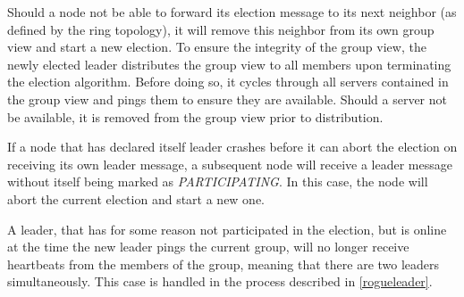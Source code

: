 \documentclass[runningheads]{llncs}
\begin{document}
Should a node not be able to forward its election message to its next neighbor (as defined by the ring topology), it will remove this neighbor from its own group view and start a new election. To ensure the integrity of the group view, the newly elected leader distributes the group view to all members upon terminating the election algorithm. Before doing so, it cycles through all servers contained in the group view and pings them to ensure they are available. Should a server not be available, it is removed from the group view prior to distribution.

If a node that has declared itself leader crashes before it can abort the election on receiving its own leader message, a subsequent node will receive a leader message without itself being marked as \textit{PARTICIPATING}. In this case, the node will abort the current election and start a new one.

A leader, that has for some reason not participated in the election, but is online at the time the new leader pings the current group, will no longer receive heartbeats from the members of the group, meaning that there are two leaders simultaneously. This case is handled in the process described in \ref{rogueleader}.
\end{document}
